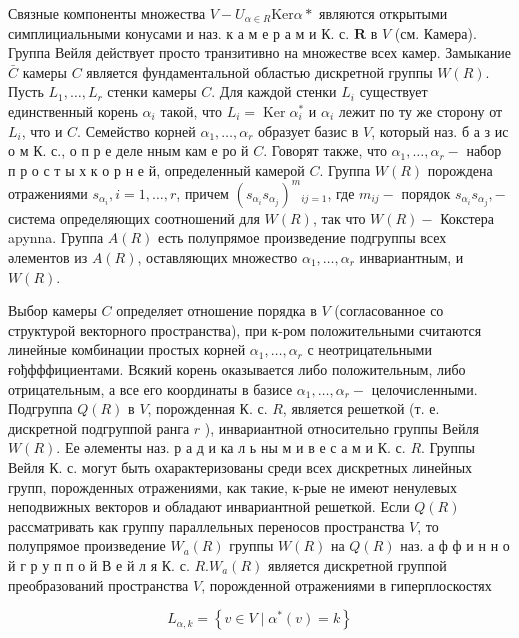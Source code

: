 \documentclass[10pt]{article}
\begin{document}
Связные компоненты множества $V-U_{\alpha \in R} \mathrm{Ker} \alpha *$ являются открытыми симплициальными конусами и наз. к а м е р а м и К. с. $\boldsymbol{R}$ в $V$ (см. Камера). Группа Вейля действует просто транзитивно на множестве всех камер. Замыкание $\bar{C}$ камеры $C$ является фундаментальной областью дискретной группы $W(R)$. Пусть $L_{1}, \ldots, L_{r}$ стенки камеры $C$. Для каждой стенки $L_{i}$ существует единственный корень $\alpha_{i}$ такой, что $L_{i}=\operatorname{Ker} \alpha_{i}^{*}$ и $\alpha_{i}$ лежит по ту же сторону от $L_{i}$, что и $C$. Семейство корней $\alpha_{1}, \ldots, \alpha_{r}$ образует базис в $V$, который наз. б а з ис о м К. с., о п р е деле нным кам е ро й $C$. Говорят также, что $\alpha_{1}, \ldots, \alpha_{r}-$ набор п р о с т ы х к о р н е й, определенный камерой $C$. Группа $W(R)$ порождена отражениями $s_{\alpha_{i}}, i=1, \ldots, r$, причем $\left(s_{\alpha_{i}} s_{\alpha_{j}}\right)^{m}{ }_{i j=1}$, где $m_{i j}-$ порядок $s_{\alpha_{i}} s_{\alpha_{j}},-$ система определяющих соотношений для $W(R)$, так что $W(R)-$ Кокстера apynna. Группа $A(R)$ есть полупрямое произведение подгруппы всех әлементов из $A(R)$, оставляющих множество $\alpha_{1}, \ldots, \alpha_{r}$ инвариантным, и $W(R)$.



Выбор камеры $C$ определяет отношение порядка в $V$ (согласованное со структурой векторного пространства), при к-ром положительными считаются линейные комбинации простых корней $\alpha_{1}, \ldots, \alpha_{r}$ с неотрицательными ғођфффициентами. Всякий корень оказывается либо положительным, либо отрицательным, а все его координаты в базисе $\alpha_{1}, \ldots, \alpha_{r}-$ целочисленными. Подгруппа $Q(R)$ в $V$, порожденная К. с. $R$, является решеткой (т. е. дискретной подгруппой ранга $r$ ), инвариантной относительно группы Вейля $W(R)$. Ее әлементы наз. р а д и ка л ь ны м и в е с а м и К. с. $R$. Группы Вейля К. с. могут быть охарактеризованы среди всех дискретных линейных групп, порожденных отражениями, как такие, к-рые не имеют ненулевых неподвижных векторов и обладают инвариантной решеткой. Если $Q(R)$ рассматривать как группу параллельных переносов пространства $V$, то полупрямое произведение $W_{a}(R)$ группы $W(R)$ на $Q(R)$ наз. а ф ф и н н о й г р у п п о й В е й л я К. с. $R . W_{a}(R)$ является дискретной группой преобразований пространства $V$, порожденной отражениями в гиперплоскостях



\[

L_{\alpha, k}=\left\{v \in V \mid \alpha^{*}(v)=k\right\}

\]
\end{document}
